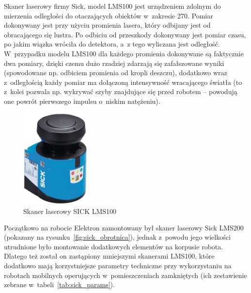 Skaner laserowy firmy Sick, model LMS100 jest urządzeniem zdolnym do mierzenia
odległości do otaczających obiektów w~zakresie 270\textdegree. Pomiar dokonywany
jest przy użyciu promienia lasera, który odbijany jest od obracającego się
lustra. Po odbiciu od przeszkody dokonywany jest pomiar czasu, po jakim wiązka
wróciła do detektora, a~z tego wyliczana jest odległość. W~przypadku modelu
LMS100 dla każdego promienia dokonywane są faktycznie dwa pomiary, dzięki czemu
dużo rzadziej zdarzają się zafałszowane wyniki (spowodowane np. odbiciem
promienia od kropli deszczu), dodatkowo wraz z~odległością każdy pomiar ma
dołączoną intensywność wracającego światła (to z~kolei pozwala np. wykrywać
szyby znajdujące się przed robotem -- powodują one powrót pierwszego impulsu 
o~niskim natężeniu).

\begin{figure}[h!]
\centering
\includegraphics[height=5cm]{../img/LMS100}
\caption{Skaner laserowy SICK LMS100}
\label{fig:sick}
\end{figure}

Początkowo na robocie Elektron zamontowany był skaner laserowy Sick LMS200
(pokazany na rysunku~\ref{fig:sick_obrotnica}), jednak z~powodu jego wielkości
utrudnione było montowanie dodatkowych elementów na korpusie robota. Dlatego też
został on zastąpiony mniejszymi skanerami LMS100, które dodatkowo mają
korzystniejsze parametry techniczne przy wykorzystaniu na robotach mobilnych
operujących w~pomieszczeniach zamkniętych (ich zestawienie zebrane 
w~tabeli~\ref{tab:sick_params}).

